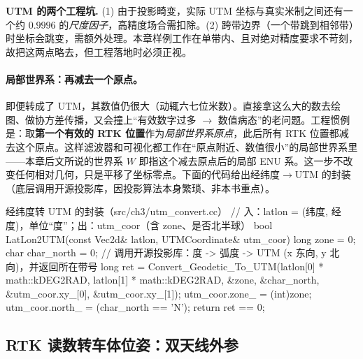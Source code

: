 \begin{note}
\textbf{UTM 的两个工程坑.}\;
(1) 由于投影畸变，实际 UTM 坐标与真实米制之间还有一个约 $0.9996$ 的\emph{尺度因子}，高精度场合需扣除\cite{gao2023slamad}。(2) 跨带边界（一个带跳到相邻带）时坐标会跳变，需额外处理。本章样例工作在单带内、且对绝对精度要求不苛刻，故把这两点略去，但工程落地时必须正视。
\end{note}

\paragraph{局部世界系：再减去一个原点。}
即便转成了 UTM，其数值仍很大（动辄六七位米数）。直接拿这么大的数去绘图、做协方差传播，又会撞上“有效数字过多 $\to$ 数值病态”的老问题\cite{gao2023slamad}。工程惯例是：取\textbf{第一个有效的 RTK 位置}作为\emph{局部世界系原点}，此后所有 RTK 位置都减去这个原点。这样滤波器和可视化都工作在“原点附近、数值很小”的局部世界系里——本章后文所说的世界系 $W$ 即指这个减去原点后的局部 ENU 系。这一步不改变任何相对几何，只是平移了坐标零点。下面的代码给出经纬度$\to$UTM 的封装（底层调用开源投影库，因投影算法本身繁琐、非本书重点）。

\begin{codebox}[C++]{经纬度转 UTM 的封装（src/ch3/utm\_convert.cc）}
// 入：latlon = (纬度, 经度)，单位“度”；出：utm_coor（含 zone、是否北半球）
bool LatLon2UTM(const Vec2d& latlon, UTMCoordinate& utm_coor) {
  long zone = 0; char char_north = 0;
  // 调用开源投影库：度 -> 弧度 -> UTM (x 东向, y 北向)，并返回所在带号
  long ret = Convert_Geodetic_To_UTM(latlon[0] * math::kDEG2RAD,
                                     latlon[1] * math::kDEG2RAD, &zone, &char_north,
                                     &utm_coor.xy_[0], &utm_coor.xy_[1]);
  utm_coor.zone_  = (int)zone;
  utm_coor.north_ = (char_north == 'N');
  return ret == 0;
}
\end{codebox}

\subsection{RTK 读数转车体位姿：双天线外参}
\label{sec:gins-extrinsic}

